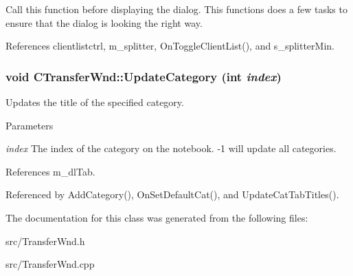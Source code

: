 Call this function before displaying the dialog. This functions does a few tasks to ensure that the dialog is looking the right way. 

References clientlistctrl, m\_\-splitter, OnToggleClientList(), and s\_\-splitterMin.
\subsubsection[{UpdateCategory}]{\setlength{\rightskip}{0pt plus 5cm}void CTransferWnd::UpdateCategory (int {\em index})}\label{classCTransferWnd_a236eb2be8cab9cacff82ed02858ca2b3}


Updates the title of the specified category. 
\begin{DoxyParams}{Parameters}
\item[{\em index}]The index of the category on the notebook. -\/1 will update all categories. \end{DoxyParams}


References m\_\-dlTab.

Referenced by AddCategory(), OnSetDefaultCat(), and UpdateCatTabTitles().

The documentation for this class was generated from the following files:\begin{DoxyCompactItemize}
\item 
src/TransferWnd.h\item 
src/TransferWnd.cpp\end{DoxyCompactItemize}
